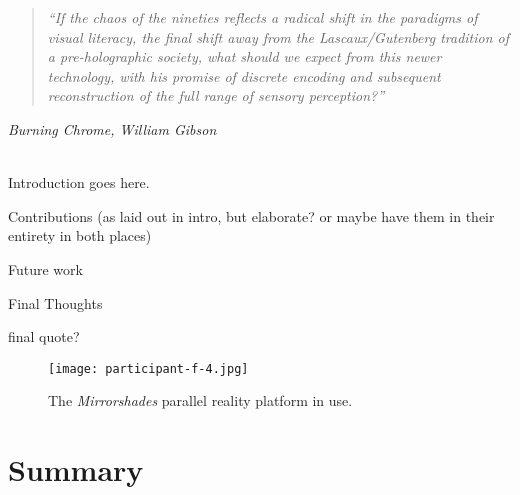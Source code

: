 \begin{quote}
	\textit{``If the chaos of the nineties reflects a radical shift in the paradigms of visual literacy, the final shift away from the Lascaux/Gutenberg tradition of a pre-holographic society, what should we expect from this newer technology, with his promise of discrete encoding and subsequent reconstruction of the full range of sensory perception?''}
\end{quote}
\hfill \textit{Burning Chrome, William Gibson}
\\
\\


\label{chapter-conclusions}

Introduction goes here.


Contributions (as laid out in intro, but elaborate? or maybe have them in their entirety in both places)


Future work


Final Thoughts

final quote?




\begin{figure}[h]
	\begin{center}
		\texttt{[image: participant-f-4.jpg]}
		\caption{The \textit{Mirrorshades} parallel reality platform in use.}
		\label{participant-f-4.jpg}
	\end{center}	
\end{figure}










\section{Summary}


